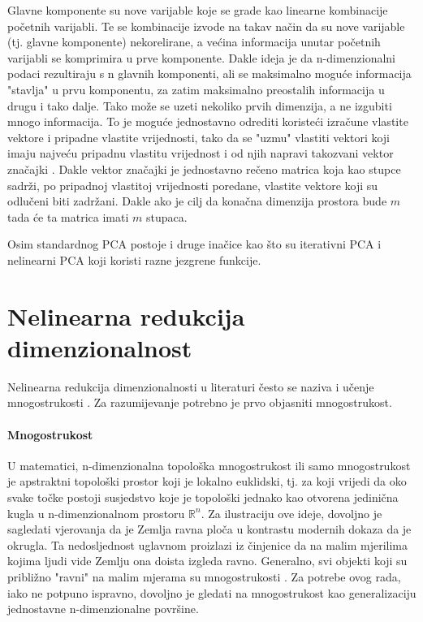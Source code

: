\documentclass[times, utf8, diplomski]{fer}
\begin{document}
Glavne komponente su nove varijable koje se grade kao linearne kombinacije početnih varijabli. Te se kombinacije izvode na takav način da su nove varijable (tj. glavne komponente) nekorelirane, a većina informacija unutar početnih varijabli se komprimira u prve komponente. Dakle ideja je da n-dimenzionalni podaci rezultiraju s n glavnih komponenti, ali se maksimalno moguće informacija "stavlja" u prvu komponentu, za zatim maksimalno preostalih informacija u drugu i tako dalje. Tako može se uzeti nekoliko prvih dimenzija, a ne izgubiti mnogo informacija. To je moguće jednostavno odrediti koristeći izračune vlastite vektore i pripadne vlastite vrijednosti, tako da se "uzmu" vlastiti vektori koji imaju najveću pripadnu vlastitu vrijednost i od njih napravi takozvani vektor značajki . Dakle vektor značajki je jednostavno rečeno matrica koja kao stupce sadrži, po pripadnoj vlastitoj vrijednosti poredane, vlastite vektore koji su odlučeni biti zadržani. Dakle ako je cilj da konačna dimenzija prostora bude $m$ tada će ta matrica imati $m$ stupaca.

Osim standardnog PCA postoje i druge inačice kao što su iterativni PCA i nelinearni PCA koji koristi razne jezgrene  funkcije.

\newpage
\section{Nelinearna redukcija dimenzionalnost}\label{sec:nonlin_reduc}

Nelinearna redukcija dimenzionalnosti u literaturi često se naziva i učenje mnogostrukosti . Za razumijevanje potrebno je prvo objasniti mnogostrukost.

\paragraph{Mnogostrukost}
U matematici, n-dimenzionalna topološka mnogostrukost ili samo mnogostrukost je apstraktni topološki prostor koji je lokalno euklidski, tj. za koji vrijedi da oko svake točke postoji susjedstvo koje je topološki jednako kao otvorena jedinična kugla u n-dimenzionalnom prostoru $\mathbb{R}^n$. Za ilustraciju ove ideje, dovoljno je sagledati vjerovanja da je Zemlja ravna ploča u kontrastu modernih dokaza da je okrugla. Ta nedosljednost uglavnom proizlazi iz činjenice da na malim mjerilima kojima ljudi vide Zemlju ona doista izgleda ravno. Generalno, svi objekti koji su približno "ravni" na malim mjerama su mnogostrukosti \citep{rowland}.
Za potrebe ovog rada, iako ne potpuno ispravno, dovoljno je gledati na mnogostrukost kao generalizaciju jednostavne n-dimenzionalne površine.
\end{document}
